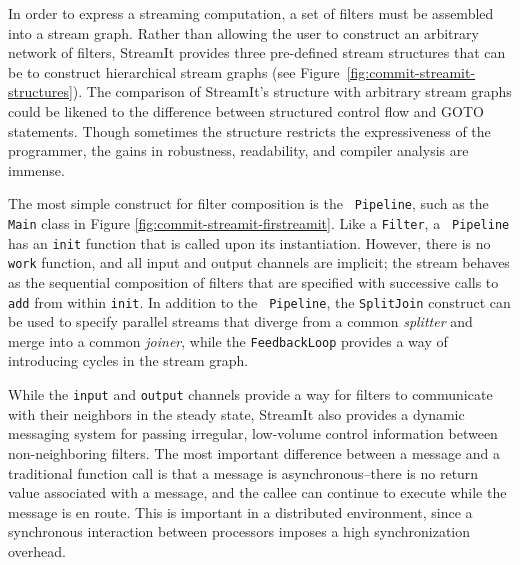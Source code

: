 In order to express a streaming computation, a set of filters must be
assembled into a stream graph.  Rather than allowing the user to
construct an arbitrary network of filters, StreamIt provides three
pre-defined stream structures that can be to construct hierarchical
stream graphs (see Figure~\ref{fig:commit-streamit-structures}).  The
comparison of StreamIt's structure with arbitrary stream graphs could
be likened to the difference between structured control flow and GOTO
statements.  Though sometimes the structure restricts the
expressiveness of the programmer, the gains in robustness,
readability, and compiler analysis are immense.

The most simple construct for filter composition is the {\tt
Pipeline}, such as the {\tt Main} class in Figure
\ref{fig:commit-streamit-firstreamit}.  Like a {\tt Filter}, a {\tt
Pipeline} has an {\tt init} function that is called upon its
instantiation.  However, there is no {\tt work} function, and all
input and output channels are implicit; the stream behaves as the
sequential composition of filters that are specified with successive
calls to {\tt add} from within {\tt init}.  In addition to the {\tt
Pipeline}, the {\tt SplitJoin} construct can be used to specify
parallel streams that diverge from a common {\it splitter} and merge
into a common {\it joiner}, while the {\tt FeedbackLoop} provides a
way of introducing cycles in the stream graph.

While the {\tt input} and {\tt output} channels provide a way for
filters to communicate with their neighbors in the steady state,
StreamIt also provides a dynamic messaging system for passing
irregular, low-volume control information between non-neighboring
filters.  
The most important difference between a message and a traditional
function call is that a message is asynchronous--there is no return
value associated with a message, and the callee can continue to
execute while the message is en route.  This is important in a
distributed environment, since a synchronous interaction between
processors imposes a high synchronization overhead.


